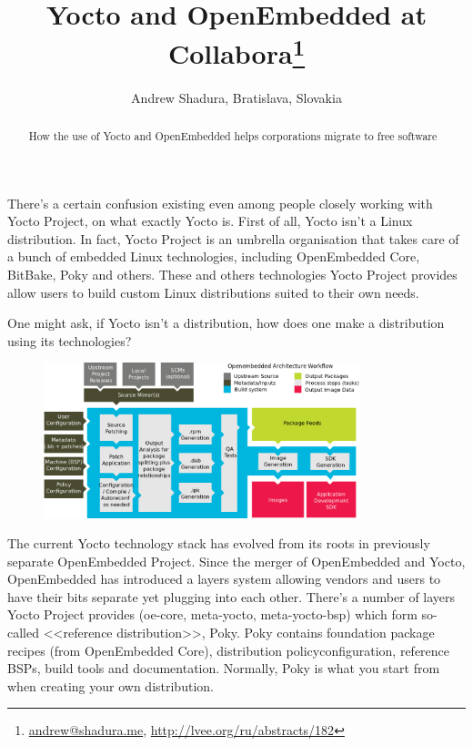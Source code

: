 \documentclass[10pt, a5paper]{article}
\begin{document}
\title{Yocto and OpenEmbedded at Collabora\footnote{\url{andrew@shadura.me}, \url{http://lvee.org/ru/abstracts/182}}}
\author{Andrew Shadura, Bratislava, Slovakia}
\maketitle
\begin{abstract}
How the use of Yocto and OpenEmbedded helps corporations migrate to free software
\end{abstract}

There's a certain confusion existing even among people closely \linebreak working with Yocto Project, on what exactly Yocto is. First of all, Yocto isn't a Linux distribution. In fact, Yocto Project is an umbrella organisation that takes care of a bunch of embedded Linux technologies, including OpenEmbedded Core, BitBake, Poky and others. These and others technologies Yocto Project provides allow users to build custom Linux distributions suited to their own needs.

One might ask, if Yocto isn't a distribution, how does one make a distribution using its technologies?

\begin{figure}[h!]
  \centering
  \includegraphics[height=4.5cm]{w_07_2016_Shadura1.png}
\end{figure}

The current Yocto technology stack has evolved from its roots in previously separate OpenEmbedded Project. Since the merger \linebreak of OpenEmbedded and Yocto, OpenEmbedded has introduced a layers system allowing vendors and users to have their bits separate yet \linebreak plugging into each other. There's a number of layers Yocto Project provides ({\ttfamily oe-core, meta-yocto, meta-yocto-bsp}) which form so-called \linebreak <<reference distribution>>, Poky. Poky contains foundation package \linebreak recipes (from OpenEmbedded Core), distribution policy\linebreak configuration, reference BSPs, build tools and documentation. Normally, Poky is what you start from when creating your own distribution.
\end{document}
